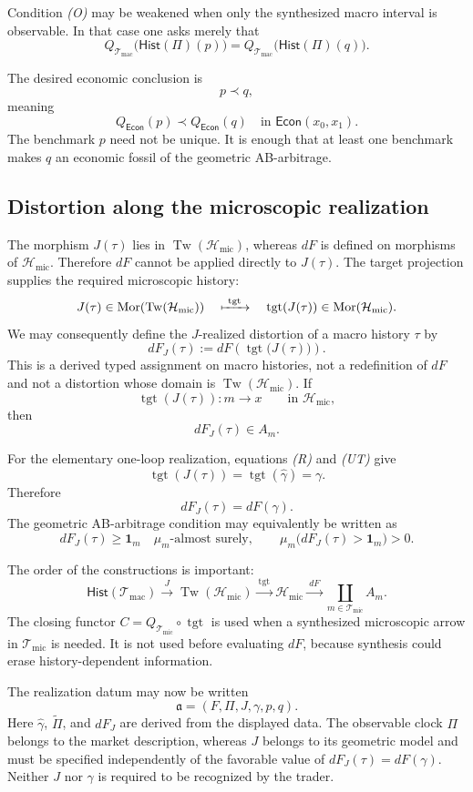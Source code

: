 \documentclass[11pt,a4paper]{article}
\newcommand{\Econ}{\mathsf{Econ}}
\newcommand{\Hist}{\mathsf{Hist}}
\newcommand{\Tw}{\operatorname{Tw}}
\newcommand{\Tmic}{\mathcal T_{\mathrm{mic}}}
\newcommand{\Tmac}{\mathcal T_{\mathrm{mac}}}
\newcommand{\Hmic}{\mathcal H_{\mathrm{mic}}}
\DeclareMathOperator{\tgt}{tgt}
\begin{document}
Condition \emph{(O)} may be weakened when only the synthesized macro interval
is observable. In that case one asks merely that
\[
  Q_{\Tmac}\bigl(\Hist(\Pi)(p)\bigr)
  =Q_{\Tmac}\bigl(\Hist(\Pi)(q)\bigr).
\]

The desired economic conclusion is
\[
  p\prec q,
\]
meaning
\[
  Q_{\Econ}(p)\prec Q_{\Econ}(q)
  \quad\text{in }\Econ(x_0,x_1).
\]
The benchmark \(p\) need not be unique. It is enough that at least one
benchmark makes \(q\) an economic fossil of the geometric AB-arbitrage.

\subsection{Distortion along the microscopic realization}

The morphism \(J(\tau)\) lies in \(\Tw(\Hmic)\), whereas \(dF\) is defined on
morphisms of \(\Hmic\). Therefore \(dF\) cannot be applied directly to
\(J(\tau)\). The target projection supplies the required microscopic
history:
\[
  J(\tau)\in\operatorname{Mor}(\Tw(\Hmic))
  \quad\xmapsto{\ \tgt\ }\quad
  \tgt(J(\tau))\in\operatorname{Mor}(\Hmic).
\]
We may consequently define the \(J\)-realized distortion of a macro history
\(\tau\) by
\[
  dF_J(\tau)
  :=
  dF\!\left(\tgt\bigl(J(\tau)\bigr)\right).
  \tag{DJ}
\]
This is a derived typed assignment on macro histories, not a redefinition of
\(dF\) and not a distortion whose domain is \(\Tw(\Hmic)\). If
\[
  \tgt(J(\tau)):m\longrightarrow x
  \qquad\text{in }\Hmic,
\]
then
\[
  dF_J(\tau)\in A_m.
\]

For the elementary one-loop realization, equations \emph{(R)} and
\emph{(UT)} give
\[
  \tgt(J(\tau))
  =
  \tgt(\widehat\gamma)
  =
  \gamma.
\]
Therefore
\[
	dF_J(\tau)=dF(\gamma).
  \tag{DL}
\]
The geometric AB-arbitrage condition may equivalently be written as
\[
  dF_J(\tau)\geq\mathbf1_m
  \quad\mu_m\text{-almost surely},
  \qquad
  \mu_m\bigl(dF_J(\tau)>\mathbf1_m\bigr)>0.
\]

The order of the constructions is important:
\[
  \Hist(\Tmac)
  \xrightarrow{\ J\ }
  \Tw(\Hmic)
  \xrightarrow{\ \tgt\ }
  \Hmic
  \xrightarrow{\ dF\ }
  \coprod_{m\in\Tmic}A_m.
\]
The closing functor \(C=Q_{\Tmic}\circ\tgt\) is used when a synthesized
microscopic arrow in \(\Tmic\) is needed. It is not used before evaluating
\(dF\), because synthesis could erase history-dependent information.

The realization datum may now be written
\[
  \mathfrak a=(F,\Pi,J,\gamma,p,q).
\]
Here \(\widehat\gamma\), \(\widetilde\Pi\), and \(dF_J\) are derived from the
displayed data. The observable clock \(\Pi\) belongs to the market
description, whereas \(J\) belongs to its geometric model and must be
specified independently of the favorable value of \(dF_J(\tau)=dF(\gamma)\).
Neither \(J\) nor \(\gamma\) is required to be recognized by the trader.
\end{document}
